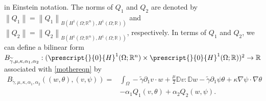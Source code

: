 \documentclass[11pt,letterpaper,reqno]{amsart}
\numberwithin{equation}{section}
\newcommand{\norm}[1]{\left\lVert#1\right\rVert}
\begin{document}
in Einstein notation. The norms of \(Q_{1}\) and \(Q_{2}\) are denoted by \(\norm{Q_{1}}=\norm{Q_{1}}_{B(H^{1}(\Omega;\mathbb{R}^{n}),H^{1}(\Omega;\mathbb{R}))}\) and \(\norm{Q_{2}}=\norm{Q_{2}}_{B(H^{1}(\Omega;\mathbb{R}^{n}),H^{1}(\Omega;\mathbb{R}))}\), respectively. In terms of \(Q_{1}\) and \(Q_{2}\), we can define a bilinear form \(B_{\widetilde{\gamma},\mu,\kappa,\alpha_{1},\alpha_{2}}: (\prescript{}{0}{H}^{1}(\Omega;\mathbb{R}^{n}) \times \prescript{}{0}{H}^{1}(\Omega;\mathbb{R}))^{2} \to \mathbb{R}\) associated with \eqref{mothereqn} by
\begin{align}
    B_{\widetilde{\gamma},\mu,\kappa,\alpha_{1},\alpha_{2}}((w,\theta),(v,\psi))=&\int_{\Omega}-\widetilde{\gamma}\partial_{1}v \cdot w+\frac{\mu}{2}\mathbb{D}v:\mathbb{D}w-\widetilde{\gamma}\partial_{1}\psi \theta + \kappa \nabla\psi \cdot \nabla\theta \nonumber \\
    &-\alpha_{1}Q_{1}(v ,\theta)+\alpha_{2}Q_{2}(w,\psi). \label{bform}
\end{align}
\end{document}
